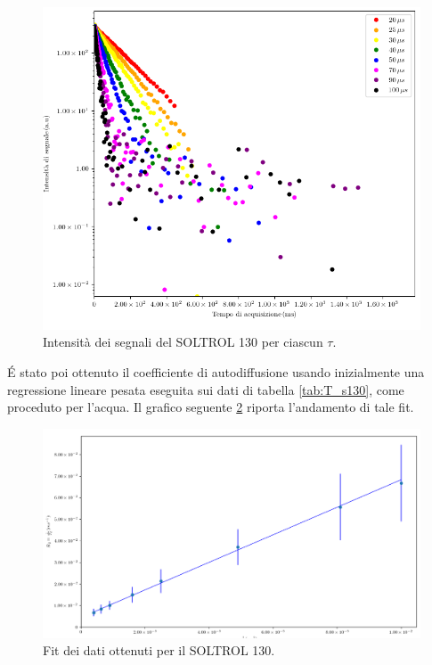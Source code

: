 \begin{figure}[h!]
\centering
\includegraphics[scale=0.3]{Figure/SOLTROL130_SigTSig.png}
\caption{Intensità dei segnali del SOLTROL 130 per ciascun $\tau$.}
\label{fig:S_s130}
\end{figure}

\'E stato poi ottenuto il coefficiente di autodiffusione usando inizialmente una regressione lineare pesata eseguita sui dati di tabella \ref{tab:T_s130}, come proceduto per l'acqua.
Il grafico seguente \ref{fig:Df_s130} riporta l'andamento di tale fit.

\begin{figure}[h!]
\centering
\includegraphics[scale=0.3]{Figure/SOLTROL130_calc.png}
\caption{Fit dei dati ottenuti per il SOLTROL 130.}
\label{fig:Df_s130}
\end{figure}

